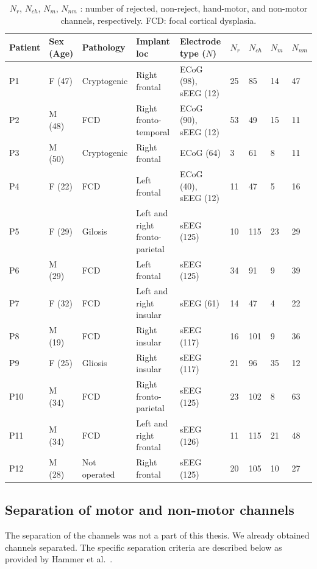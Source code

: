 \begin{table}[!htbp]
\centering
\begin{tabular}{|p{1.3cm}|p{1.05cm}|p{2.15cm}|p{2.2cm}|p{1.8cm}|p{0.5cm}|p{0.65cm}|p{0.6cm}|p{0.8cm}|}
\toprule
Patient&Sex (Age)&Pathology&Implant loc&Electrode type ($N$)& $N_r$ &$N_{ch}$&$N_{m}$&$N_{nm}$ \\
\hline
\midrule
P1 & F (47) & Cryptogenic & Right frontal & ECoG (98),  sEEG (12) & 25 & 85 & 14 & 47 \\
\hline
P2 & M (48) & FCD & Right fronto-temporal & ECoG (90), sEEG (12) & 53 & 49 & 15 & 11 \\
\hline
P3 & M (50) & Cryptogenic & Right frontal & ECoG (64) & 3 & 61 & 8 & 11 \\
\hline
P4 & F (22) & FCD & Left frontal & ECoG (40),  sEEG (12) & 11 & 47 & 5 & 16 \\
\hline
P5 & F (29) & Gilosis & Left and right fronto-parietal &  sEEG (125) & 10 & 115 & 23 & 29 \\
\hline
P6 & M (29) & FCD & Left frontal &  sEEG (125) & 34 & 91 & 9 & 39 \\
\hline
P7 & F (32) & FCD & Left and right insular &  sEEG (61) & 14 & 47 & 4 & 22 \\
\hline
P8 & M (19) & FCD & Right insular &  sEEG (117) & 16 & 101 & 9 & 36 \\
\hline
P9 & F (25) & Gliosis & Right insular &  sEEG (117) & 21 & 96 & 35 & 12 \\
\hline
P10 & M (34) & FCD & Right fronto-parietal &  sEEG (125) & 23 & 102 & 8 & 63 \\
\hline
P11 & M (34) & FCD & Left and right frontal &  sEEG (126) & 11 & 115 & 21 & 48 \\
\hline
P12 & M (28) & Not operated & Right frontal &  sEEG (125) & 20 & 105 & 10 & 27 \\
\bottomrule
\end{tabular}
\caption[Patient details]{$N_r$, $N_{ch}$, $N_{m}$, $N_{nm}$  : number of rejected, non-reject, hand-motor, and non-motor channels, respectively. FCD: focal cortical dysplasia.}
\label{tab:patient-table}
\end{table}

\subsection{Separation of motor and non-motor channels}\label{subsec:separation-of-motor-and-non-motor-channels}
The separation of the channels was not a part of this thesis. 
We already obtained channels separated.
The specific separation criteria are described below as provided by Hammer et al.~\cite{Hammer-2021}. \\

